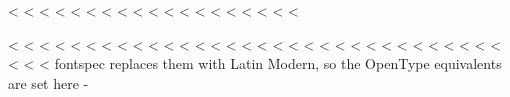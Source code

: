 <%
<%
<%
<%
<%
<%
<%
<%
<%
<%
<%
<%
<%
<%
<%
<%
<%
<%
<%

<%
<%
<%
<%
<%
<%
<%
<%
<%
<%
<%
<%
<%
<%
<%
<%
<%
<%
<%
<%
<%
<%
<%
<%
<%
<%
<%
<%
<%
<%
<%
<%
<%
<%
<%
fontspec replaces them with Latin Modern, so the OpenType equivalents are set here -%

